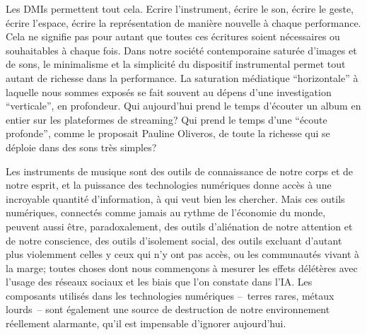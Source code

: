 






Les \glspl{DMI} permettent tout cela. Ecrire l'instrument, écrire le son, écrire le geste, écrire l'espace, écrire la représentation de manière nouvelle à chaque performance. Cela ne signifie pas pour autant que toutes ces écritures soient nécessaires ou souhaitables à chaque fois. Dans notre société contemporaine saturée d'images et de sons, le minimalisme et la simplicité du dispositif instrumental permet tout autant de richesse dans la performance. La saturation médiatique ``horizontale'' à laquelle nous sommes exposés se fait souvent au dépens d'une investigation ``verticale'', en profondeur. 
Qui aujourd'hui prend le temps d'écouter un album en entier sur les plateformes de streaming? Qui prend le temps d'une ``écoute profonde'', comme le proposait Pauline Oliveros, de toute la richesse qui se déploie dans des sons très simples?

Les instruments de musique sont des outils de connaissance de notre corps et de notre esprit, et la puissance des technologies numériques donne accès à une incroyable quantité d'information, à qui veut bien les chercher. Mais ces outils numériques, connectés comme jamais au rythme de l'économie du monde, peuvent aussi être, paradoxalement, des outils d'aliénation de notre attention et de notre conscience, des outils d'isolement social, des outils excluant d'autant plus violemment celles y ceux qui n'y ont pas accès, ou les communautés vivant à la marge; toutes choses dont nous commençons à mesurer les effets délétères avec l'usage des réseaux sociaux et les biais que l'on constate dans l'IA. Les composants utilisés dans les technologies numériques --~terres rares, métaux lourds~-- sont également une source de destruction de notre environnement réellement alarmante, qu'il est impensable d'ignorer aujourd'hui.

